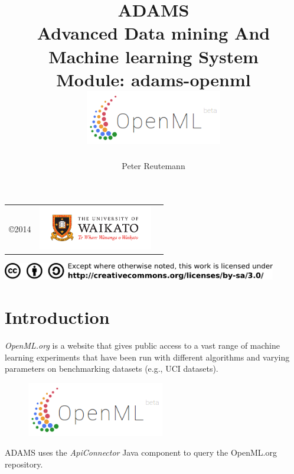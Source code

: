 \documentclass[a4paper]{book}
\title{
  \textbf{ADAMS} \\
  {\Large \textbf{A}dvanced \textbf{D}ata mining \textbf{A}nd \textbf{M}achine
  learning \textbf{S}ystem} \\
  {\Large Module: adams-openml} \\
  \vspace{1cm}
  \includegraphics[width=6cm]{images/openml-module.png} \\
}
\author{
  Peter Reutemann
}
\begin{document}
\begin{titlepage}
\maketitle

\thispagestyle{empty}
\center
\begin{table}[b]
	\begin{tabular}{c l l}
		\parbox[c][2cm]{2cm}{\copyright 2014} &
		\parbox[c][2cm]{5cm}{\includegraphics[width=5cm]{images/coat_of_arms.pdf}} \\
	\end{tabular}
	\includegraphics[width=12cm]{images/cc.png} \\
\end{table}

\end{titlepage}

\tableofcontents
\listoffigures

\chapter{Introduction}
\textit{OpenML.org}\cite{openml} is a website that gives public access to a vast range of machine learning experiments that have been run with different algorithms and varying parameters on benchmarking datasets (e.g., UCI datasets).

\begin{figure}[htb]
  \centering
  \includegraphics[width=6.0cm]{images/openml-module.png}
  \label{openml-module}
\end{figure}

ADAMS uses the \textit{ApiConnector} Java component \cite{apiconnector} to query the OpenML.org repository.

\end{document}
